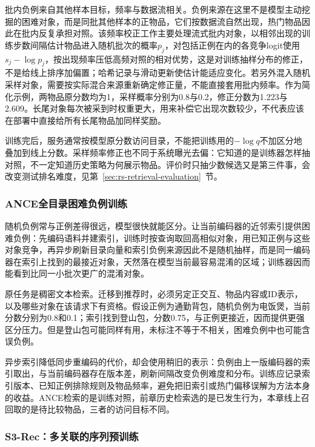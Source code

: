 批内负例来自其他样本目标，频率与数据流相关。负例来源在这里不是模型主动挖掘的困难对象，而是同批其他样本的正物品，它们按数据流自然出现，热门物品因此在批内反复承担对照。该频率校正工作主要处理流式批内对象，以相邻出现的训练步数间隔估计物品进入随机批次的概率$p_j$，对包括正例在内的各竞争logit使用$s_j-\log p_j$，按出现频率压低高频对照的相对优势，这是对训练抽样分布的修正，不是给线上排序加偏置；哈希记录与滑动更新使估计能适应变化。若另外混入随机采样对象，需要按实际混合来源重新确定修正量，不能直接套用批内频率。作为简化示例，两物品原分数均为1，采样概率分别为0.8与0.2，修正分数为1.223与2.609。长尾对象每次被采到时权重更大，用来补偿它出现次数较少，不代表应该在部署中直接给所有长尾物品加同样奖励。

训练完后，服务通常按模型原分数访问目录，不能把训练用的$-\log q$不加区分地叠加到线上分数。采样频率修正也不同于系统曝光去偏：它知道的是训练器怎样抽对照，不一定知道历史策略为何展示物品。评价时只抽少数候选又是第三件事，会改变测试排名难度，见第~\ref{sec:rs-retrieval-evaluation}~节。

\Needspace{85mm}
\subsubsection{ANCE全目录困难负例训练}
\label{sec:rs-ance}

随机负例常与正例差得很远，模型很快就能区分。让当前编码器的近邻索引提供困难负例：先编码语料并建索引，训练时按查询取回高相似对象，用已知正例与这些对象竞争，再异步刷新目录向量和索引负例来源因此不是随机抽样，而是同一编码器在索引上找到的最接近对象，天然落在模型当前最容易混淆的区域；训练器因而能看到比同一小批次更广的混淆对象。

原任务是稠密文本检索。迁移到推荐时，必须另定正交互、物品内容或ID表示，以及哪些对象在该请求下有资格。假设正例为通勤背包，随机负例为电饭煲，当前分数分别为0.8和0.1；索引找到登山包，分数0.75，与正例更接近，因而提供更强区分压力。但是登山包可能同样有用，未标注不等于不相关，困难负例中也可能含误负例。

异步索引降低同步重编码的代价，却会使用稍旧的表示：负例由上一版编码器的索引取出，与当前编码器存在版本差，刷新间隔改变负例难度和分布。训练应记录索引版本、已知正例排除规则及物品频率，避免把旧索引或热门偏移误解为方法本身的收益。ANCE检索的是训练对照，前章历史检索选的是已发生行为，本章线上召回取的是待比较物品，三者的访问目标不同。

\subsubsection{S3-Rec：多关联的序列预训练}
\label{sec:rs-s3rec}

